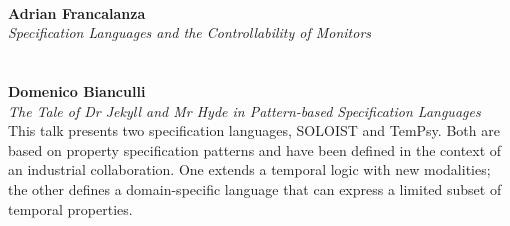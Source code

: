 \documentclass{article}
\newcommand{\talk}[3]{
\vspace{0.5em}~\\
\noindent
\textbf{#1}\\ 
\noindent\emph{#2}\\ 
\noindent#3\\
}
\begin{document}
\talk{Adrian Francalanza}{Specification Languages and the Controllability of Monitors}{}
\talk{Domenico Bianculli}{The Tale of Dr Jekyll and Mr Hyde in Pattern-based Specification Languages}{This talk presents two specification languages, SOLOIST and TemPsy. Both are based on property specification patterns and have been defined in the context of an industrial collaboration. One extends a temporal logic with new modalities; the other defines a domain-specific language  that can express a limited subset of temporal properties.}
\end{document}
